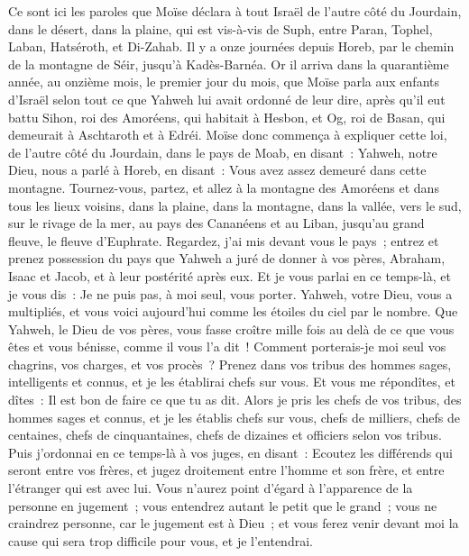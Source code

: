 \begin{multicols}{2}
\VerseOne{}Ce sont ici les paroles que Moïse déclara à tout Israël de l'autre côté du Jourdain, dans le désert, dans la plaine, qui est vis-à-vis de Suph, entre Paran, Tophel, Laban, Hatséroth, et Di-Zahab.
Il y a onze journées depuis Horeb, par le chemin de la montagne de Séir, jusqu'à Kadès-Barnéa.
Or il arriva dans la quarantième année, au onzième mois, le premier jour du mois, que Moïse parla aux enfants d'Israël selon tout ce que Yahweh lui avait ordonné de leur dire,
après qu'il eut battu Sihon, roi des Amoréens, qui habitait à Hesbon, et Og, roi de Basan, qui demeurait à Aschtaroth et à Edréi.
Moïse donc commença à expliquer cette loi, de l'autre côté du Jourdain, dans le pays de Moab, en disant~:
Yahweh, notre Dieu, nous a parlé à Horeb, en disant~: Vous avez assez demeuré dans cette montagne.
Tournez-vous, partez, et allez à la montagne des Amoréens et dans tous les lieux voisins, dans la plaine, dans la montagne, dans la vallée, vers le sud, sur le rivage de la mer, au pays des Cananéens et au Liban, jusqu'au grand fleuve, le fleuve d'Euphrate.
Regardez, j'ai mis devant vous le pays~; entrez et prenez possession du pays que Yahweh a juré de donner à vos pères, Abraham, Isaac et Jacob, et à leur postérité après eux.
Et je vous parlai en ce temps-là, et je vous dis~: Je ne puis pas, à moi seul, vous porter.
Yahweh, votre Dieu, vous a multipliés, et vous voici aujourd'hui comme les étoiles du ciel par le nombre.
Que Yahweh, le Dieu de vos pères, vous fasse croître mille fois au delà de ce que vous êtes et vous bénisse, comme il vous l'a dit~!
Comment porterais-je moi seul vos chagrins, vos charges, et vos procès~?
Prenez dans vos tribus des hommes sages, intelligents et connus, et je les établirai chefs sur vous.
Et vous me répondîtes, et dîtes~: Il est bon de faire ce que tu as dit.
Alors je pris les chefs de vos tribus, des hommes sages et connus, et je les établis chefs sur vous, chefs de milliers, chefs de centaines, chefs de cinquantaines, chefs de dizaines et officiers selon vos tribus.
Puis j'ordonnai en ce temps-là à vos juges, en disant~: Ecoutez les différends qui seront entre vos frères, et jugez droitement entre l'homme et son frère, et entre l'étranger qui est avec lui.
Vous n'aurez point d'égard à l'apparence de la personne en jugement~; vous entendrez autant le petit que le grand~; vous ne craindrez personne, car le jugement est à Dieu~; et vous ferez venir devant moi la cause qui sera trop difficile pour vous, et je l'entendrai.

\end{multicols}
